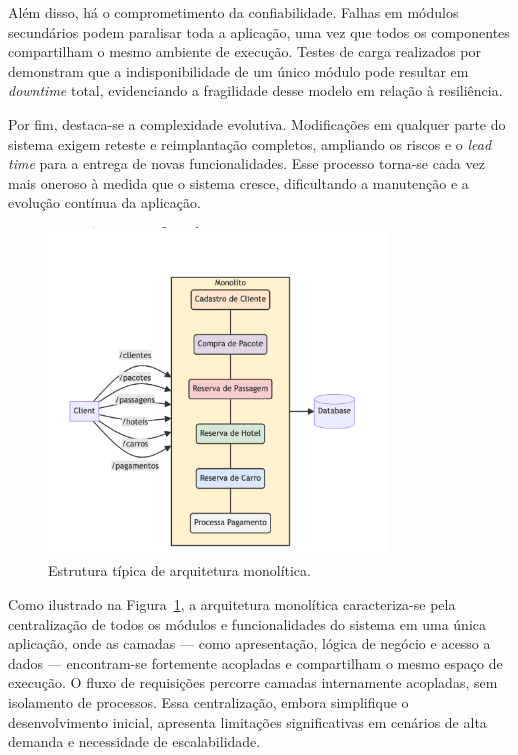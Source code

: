 Além disso, há o comprometimento da confiabilidade. Falhas em módulos secundários podem paralisar toda a aplicação, uma vez que todos os componentes compartilham o mesmo ambiente de execução. Testes de carga realizados por \cite{farhan2023performance} demonstram que a indisponibilidade de um único módulo pode resultar em \textit{downtime} total, evidenciando a fragilidade desse modelo em relação à resiliência.

Por fim, destaca-se a complexidade evolutiva. Modificações em qualquer parte do sistema exigem reteste e reimplantação completos, ampliando os riscos e o \textit{lead time} para a entrega de novas funcionalidades. Esse processo torna-se cada vez mais oneroso à medida que o sistema cresce, dificultando a manutenção e a evolução contínua da aplicação.

\begin{figure}[H]
\centering
\includegraphics[width=0.8\textwidth]{images/monolito.png}
\caption{Estrutura típica de arquitetura monolítica.}
\label{fig:monolitico}
\end{figure}

Como ilustrado na Figura~\ref{fig:monolitico}, a arquitetura monolítica caracteriza-se pela centralização de todos os módulos e funcionalidades do sistema em uma única aplicação, onde as camadas — como apresentação, lógica de negócio e acesso a dados — encontram-se fortemente acopladas e compartilham o mesmo espaço de execução. O fluxo de requisições percorre camadas internamente acopladas, sem isolamento de processos. Essa centralização, embora simplifique o desenvolvimento inicial, apresenta limitações significativas em cenários de alta demanda e necessidade de escalabilidade.

